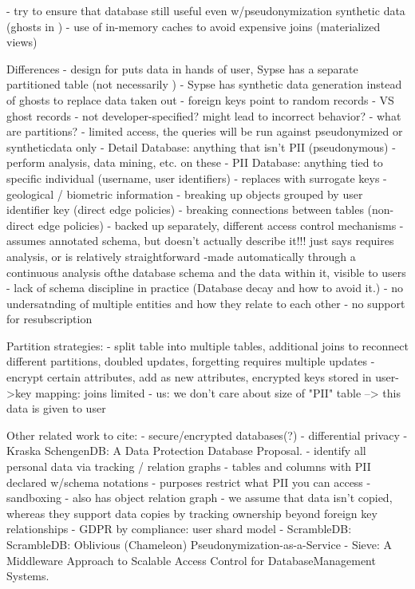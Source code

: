 - try to ensure that database still useful even w/pseudonymization
    synthetic data (ghosts in \name)
- use of in-memory caches to avoid expensive joins (materialized views)

Differences
- design for \name puts data in hands of user, Sypse has a separate partitioned table (not
necessarily )
- Sypse has synthetic data generation instead of ghosts to replace data taken out
    - foreign keys point to random records
    - VS ghost records
    - not developer-specified? might lead to incorrect behavior?
- what are partitions?
    - limited access, the queries will be run against pseudonymized or syntheticdata only
    - Detail Database: anything that isn't PII (pseudonymous)
        - perform analysis, data mining, etc. on these
    - PII Database: anything tied to specific individual (username, user identifiers)
        - replaces with surrogate keys
        - geological / biometric information
        - breaking up objects grouped by user identifier key (direct edge policies)
        - breaking connections between tables (non-direct edge policies)
    - backed up separately, different access control mechanisms
- assumes annotated schema, but doesn't actually describe it!!! just says requires analysis, or is
relatively straightforward
    -made automatically through a continuous analysis ofthe database schema and the data within it,
    visible to users
    - lack of schema discipline in practice (Database decay and how to avoid it.)
    - no undersatnding of multiple entities and how they relate to each other
- no support for resubscription

Partition strategies:
- split table into multiple tables, additional joins to reconnect different partitions, doubled updates, forgetting requires multiple
updates
- encrypt certain attributes, add as new attributes, encrypted keys stored in user->key mapping: joins limited
- us: we don't care about size of "PII" table --> this data is given to user

Other related work to cite:
- secure/encrypted databases(?)
- differential privacy
- Kraska SchengenDB: A Data Protection Database Proposal.
    - identify all personal data via tracking / relation graphs
    - tables and columns with PII declared w/schema notations
    - purposes restrict what PII you can access
    - sandboxing
    - also has object relation graph
    - we assume that data isn't copied, whereas they support data copies by tracking ownership
    beyond foreign key relationships
- GDPR by compliance: user shard model
- ScrambleDB: ScrambleDB: Oblivious (Chameleon) Pseudonymization-as-a-Service
- Sieve: A Middleware Approach to Scalable Access Control for DatabaseManagement Systems.

